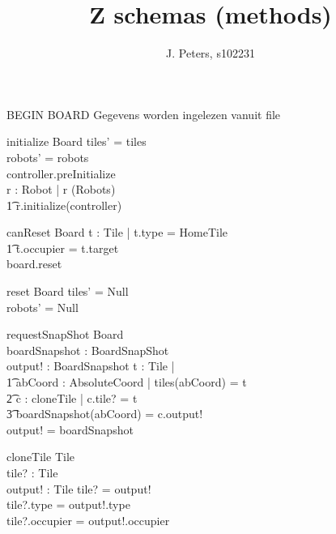 \documentclass[a4paper,11pt]{article}
\begin{document}
\title{Z schemas (methods)}
\author{J. Peters, s102231}
\maketitle


BEGIN BOARD
Gegevens worden ingelezen vanuit file
\begin{schema}{initialize}
\Delta Board
\where
tiles' = tiles \\
robots' = robots \\
controller.preInitialize \\
\forall r : Robot | r \in \dom(Robots) \implies \\ \t1
r.initialize(controller)
\end{schema}

\begin{schema}{canReset}
\Delta Board
\where
\IF \exists t : Tile | t.type = HomeTile \\ \t1
t.occupier = t.target \\
\THEN board.reset
\end{schema}

\begin{schema}{reset}
\Delta Board
\where
tiles' = Null \\
robots' = Null
\end{schema}

\begin{schema}{requestSnapShot}
\Xi Board \\
boardSnapshot : BoardSnapShot \\
output! : BoardSnapshot
\where
\forall t : Tile |  \\ \t1
\exists abCoord : AbsoluteCoord | tiles(abCoord) = t \implies \\ \t2
\exists c : cloneTile | c.tile? = t \\ \t3
boardSnapshot(abCoord) = c.output! \\
output! = boardSnapshot
\end{schema}

\begin{schema}{cloneTile}
\Delta Tile \\
tile? : Tile \\
output! : Tile 
\where
tile? \not = output! \\
tile?.type = output!.type \\
tile?.occupier = output!.occupier 
\end{schema}
\end{document}
